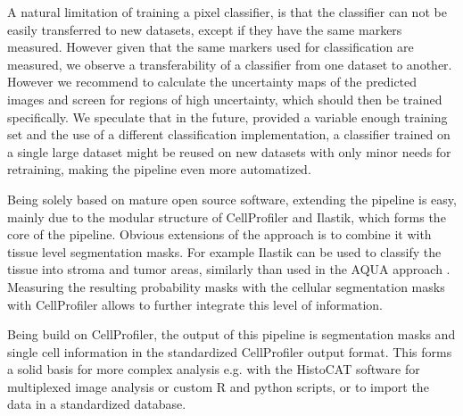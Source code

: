 \documentclass[a4paper]{article}
\begin{document}
A natural limitation of training a pixel classifier, is that the classifier can not be easily
transferred to new datasets, except if they have the same markers measured. However given that the
same markers used for classification are measured, we observe a transferability of a classifier
from one dataset to another. However we recommend to calculate the uncertainty maps of the predicted
images and screen for regions of high uncertainty, which should then be trained specifically. 
We speculate that in the future, provided a variable enough training
set and the use of a different classification implementation, a classifier trained on a single large dataset might be reused on new datasets with only minor
needs for retraining, making the pipeline even more automatized.


Being solely based on mature open source software, extending the pipeline is easy, mainly due to
the modular structure of CellProfiler and Ilastik, which forms the core of the pipeline.
Obvious extensions of the approach is to combine it with tissue level segmentation masks.
For example Ilastik can be used to classify the tissue into stroma and tumor areas, similarly
than used in the AQUA approach \cite{mccabe_automated_2005}. Measuring the resulting probability masks with the
cellular segmentation masks with CellProfiler allows to further integrate this level of
information.

Being build on CellProfiler, the output of this pipeline is segmentation masks and single cell information in the standardized
CellProfiler output format. This forms a solid basis for more complex analysis e.g. with the
HistoCAT software for multiplexed image analysis or custom R and python scripts, or to import the
data in a standardized database.
\end{document}
